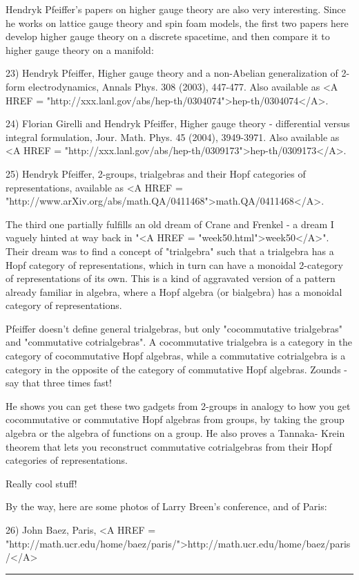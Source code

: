 Hendryk Pfeiffer's papers on higher gauge theory are also very 
interesting.  Since he works on lattice gauge theory and spin foam
models, the first two papers here develop higher gauge theory on a
discrete spacetime, and then compare it to higher gauge theory on a 
manifold:

23) Hendryk Pfeiffer, Higher gauge theory and a non-Abelian generalization of
2-form electrodynamics, Annals Phys. 308 (2003), 447-477.  Also available as
<A HREF = "http://xxx.lanl.gov/abs/hep-th/0304074">hep-th/0304074</A>.

24) Florian Girelli and Hendryk Pfeiffer, Higher gauge theory - differential 
versus integral formulation, Jour. Math. Phys. 45 (2004), 3949-3971.  
Also available as <A HREF = "http://xxx.lanl.gov/abs/hep-th/0309173">hep-th/0309173</A>.

25) Hendryk Pfeiffer, 2-groups, trialgebras and their Hopf
categories of representations, available as <A HREF = "http://www.arXiv.org/abs/math.QA/0411468">math.QA/0411468</A>.

The third one partially fulfills an old dream of Crane and Frenkel - a
dream I vaguely hinted at way back in "<A HREF =
"week50.html">week50</A>".  Their dream was to find a concept of
"trialgebra" such that a trialgebra has a Hopf category of
representations, which in turn can have a monoidal 2-category of
representations of its own.  This is a kind of aggravated version of a
pattern already familiar in algebra, where a Hopf algebra (or
bialgebra) has a monoidal category of representations.

Pfeiffer doesn't define general trialgebras, but only
"cocommutative trialgebras" and "commutative
cotrialgebras".  A cocommutative trialgebra is a category in the
category of cocommutative Hopf algebras, while a commutative
cotrialgebra is a category in the opposite of the category of
commutative Hopf algebras.  Zounds - say that three times fast!

He shows you can get these two gadgets from 2-groups in analogy to how you get 
cocommutative or commutative Hopf algebras from groups, by taking the group 
algebra or the algebra of functions on a group.   He also proves a Tannaka-
Krein theorem that lets you reconstruct commutative cotrialgebras from their
Hopf categories of representations. 

Really cool stuff!

By the way, here are some photos of Larry Breen's conference,
and of Paris:

26) John Baez, Paris, <A HREF = "http://math.ucr.edu/home/baez/paris/">http://math.ucr.edu/home/baez/paris/</A>


\par\noindent\rule{\textwidth}{0.4pt}
